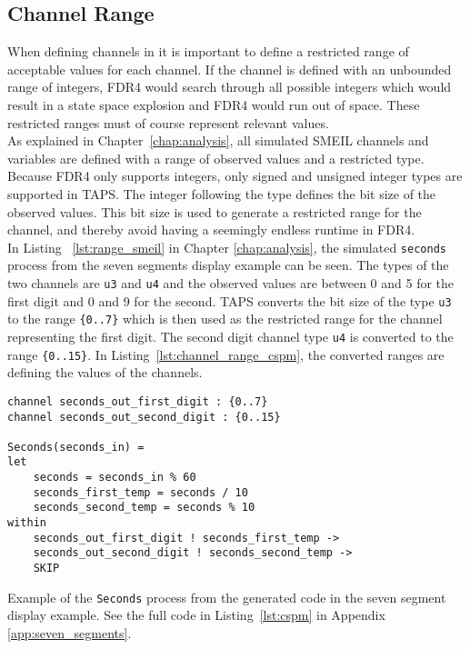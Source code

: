 \subsection{\cspm{} Channel Range}
When defining channels in \cspm{} it is important to define a restricted range of acceptable values for each channel. If the channel is defined with an unbounded range of integers, FDR4 would search through all possible integers which would result in a state space explosion and FDR4 would run out of space. These restricted ranges must of course represent relevant values.\\

As explained in Chapter~\ref{chap:analysis}, all simulated SMEIL channels and variables are defined with a range of observed values and a restricted type.
Because FDR4 only supports integers, only signed and unsigned integer types are supported in TAPS. The integer following the type defines the bit size of the observed values. This bit size is used to generate a restricted range for the \cspm{} channel, and thereby avoid having a seemingly endless runtime in FDR4.\\

In Listing ~\ref{lst:range_smeil} in Chapter \ref{chap:analysis}, the simulated \texttt{seconds} process from the seven segments display example can be seen. The types of the two channels are \texttt{u3} and \texttt{u4} and the observed values are between 0 and 5 for the first digit and 0 and 9 for the second. TAPS converts the bit size of the type \texttt{u3} to the range \texttt{\{0..7\}} which is then used as the restricted range for the \cspm{} channel representing the first digit. The second digit channel type \texttt{u4} is converted to the range \texttt{\{0..15\}}. In Listing~\ref{lst:channel_range_cspm}, the converted ranges are defining the values of the \cspm{} channels.\\

\begin{listing}
\begin{verbatim}
channel seconds_out_first_digit : {0..7}
channel seconds_out_second_digit : {0..15}

Seconds(seconds_in) =
let
    seconds = seconds_in % 60
    seconds_first_temp = seconds / 10
    seconds_second_temp = seconds % 10
within
    seconds_out_first_digit ! seconds_first_temp ->
    seconds_out_second_digit ! seconds_second_temp ->
    SKIP
\end{verbatim}
\caption{Example of the \texttt{Seconds} process from the generated \cspm{} code in the seven segment display example. See the full code in Listing~\ref{lst:cspm} in Appendix \ref{app:seven_segments}.}
\label{lst:channel_range_cspm}
\end{listing}

